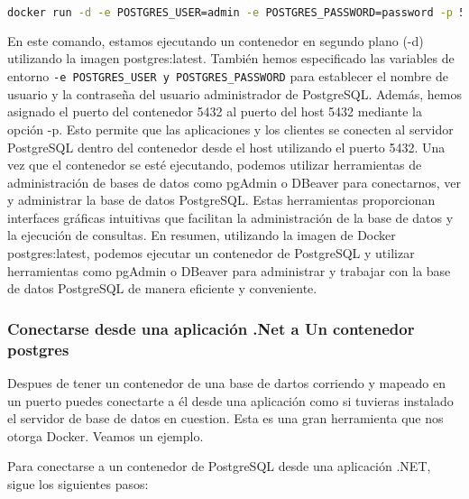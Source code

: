\documentclass{article}
\begin{document}
\begin{lstlisting}[language=bash]
docker run -d -e POSTGRES_USER=admin -e POSTGRES_PASSWORD=password -p 5432:5432 postgres:latest
\end{lstlisting}

En este comando, estamos ejecutando un contenedor en segundo plano (-d) utilizando la imagen postgres:latest. También hemos especificado las variables de entorno \lstinline{-e POSTGRES_USER y POSTGRES_PASSWORD} para establecer el nombre de usuario y la contraseña del usuario administrador de PostgreSQL. Además, hemos asignado el puerto del contenedor 5432 al puerto del host 5432 mediante la opción -p. Esto permite que las aplicaciones y los clientes se conecten al servidor PostgreSQL dentro del contenedor desde el host utilizando el puerto 5432. Una vez que el contenedor se esté ejecutando, podemos utilizar herramientas de administración de bases de datos como pgAdmin o DBeaver para conectarnos, ver y administrar la base de datos PostgreSQL. Estas herramientas proporcionan interfaces gráficas intuitivas que facilitan la administración de la base de datos y la ejecución de consultas. En resumen, utilizando la imagen de Docker postgres:latest, podemos ejecutar un contenedor de PostgreSQL y utilizar herramientas como pgAdmin o DBeaver para administrar y trabajar con la base de datos PostgreSQL de manera eficiente y conveniente.

\subsubsection*{Conectarse desde una aplicación .Net a Un contenedor postgres}
Despues de tener un contenedor de una base de dartos corriendo y mapeado en un puerto puedes conectarte a él desde una aplicación como si tuvieras instalado el servidor de base de datos en cuestion. Esta es una gran herramienta que nos otorga Docker. Veamos un ejemplo.

Para conectarse a un contenedor de PostgreSQL desde una aplicación .NET, sigue los siguientes pasos:
\end{document}
